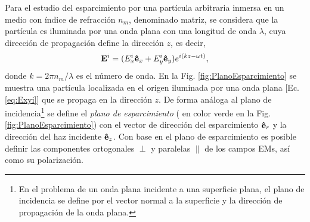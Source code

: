 Para el estudio del esparcimiento por una partícula arbitraria inmersa en un medio con índice de refracción $n_m$, denominado  matriz, se considera que la partícula es iluminada por una onda plana con una longitud de onda $\lambda$, cuya dirección de propagación define la dirección $z$, es decir,
	\begin{align}
	\vb{E}^i = (E_x^i \vu{e}_x + E_y^i \vu{e}_y)e^{i(k z - \omega t)},
	\label{eq:Exyi}
	\end{align}
donde $k = 2\pi n_m /\lambda$ es el número de onda. En la Fig.  \ref{fig:PlanoEsparcimiento} se muestra  una partícula localizada en el origen iluminada por una onda plana [Ec. \eqref{eq:Exyi}] que se propaga en la dirección $z$.  De forma análoga al plano de incidencia\footnote{En el problema de un onda plana incidente a una superficie plana, el plano de incidencia se define por el vector normal a la superficie y la dirección de propagación de la onda plana.} se define el \emph{plano de esparcimiento} ( en color verde en la Fig. \ref{fig:PlanoEsparcimiento}) con el vector de dirección del esparcimiento $\vu{e}_r$ y la dirección del haz incidente $\vu{e}_z$. Con base en el plano de esparcimiento es posible definir las componentes ortogonales $\perp$ y paralelas $\parallel$ de los campos EMs, así como su polarización. 
